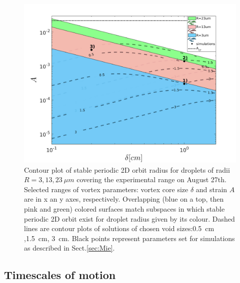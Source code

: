 \documentclass[../main.tex]{subfiles}
\begin{document}
\begin{figure}
\centering
\noindent \includegraphics[width=30pc]{gfx/fig05.png}
\caption{ Contour plot of stable periodic 2D orbit radius for droplets of radii $R=3,13,23 \ \mu m$ covering the experimental range on August 27th. Selected ranges of vortex parameters: vortex core size $\delta$ and strain $A$ are in x an y axes, respectively. Overlapping (blue on a top, then pink and green) colored surfaces match subspaces in which stable periodic 2D orbit exist for droplet radius given by its colour. Dashed lines are contour plots of solutions of chosen void sizes:0.5~cm ,1.5~cm, 3~cm. Black points represent parameters set for simulations as described in Sect.\ref{sec:Mie}.}
\label{fig05}
\end{figure}

\subsection{Timescales of motion}
\end{document}
